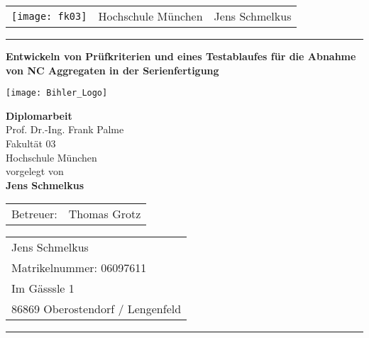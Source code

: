 
\newcommand{\trtitle}{Entwickeln von Prüfkriterien und eines Testablaufes für die Abnahme von NC Aggregaten in der Serienfertigung}
\newcommand{\trtype}{Diplomarbeit}
\newcommand{\trauthor}{Jens Schmelkus}
\newcommand{\trstrasse}{Im Gässsle 1}
\newcommand{\trmatrikelnummer}{06097611}
\newcommand{\trort}{86869 Oberostendorf / Lengenfeld}
\newcommand{\trprof}{Prof. Dr.-Ing. Frank Palme}
\newcommand{\trbetreuer}{Thomas Grotz}
\newcommand{\trfachgebiet}{XXXX}
\newcommand{\trfakultaet}{Fakultät 03}
\newcommand{\truni}{Hochschule München}
\newcommand{\trdate}{\today}

\thispagestyle{empty}

\begin{tabular}{lcr}
  \texttt{[image: fk03]} & %
  \hspace{1.5cm} \truni \hspace{1cm} &
  \trauthor
  \\
\end{tabular}

\rule{\textwidth}{0.8pt}

\vspace{1cm}
\begin{center}
  \textbf{\LARGE \trtitle}
\end{center}


\begin{center}
\texttt{[image: Bihler\_Logo]} %
\\
\end{center}

\begin{center}
  \textbf{\trtype} \\
  \trprof \\
  
  \trfakultaet \\
  \truni \\[0.5cm]
  vorgelegt von \\
  \textbf{\trauthor}
\end{center}

\vspace{1cm}



\begin{center}
\begin{tabular}{ll}
Betreuer: & \trbetreuer \\
\end{tabular}
\end{center}


\vfill

\begin{tabular}{l}
\trauthor \\
Matrikelnummer:  \trmatrikelnummer \\
\trstrasse \\
\trort
\end{tabular}

\rule{\textwidth}{0.4pt}